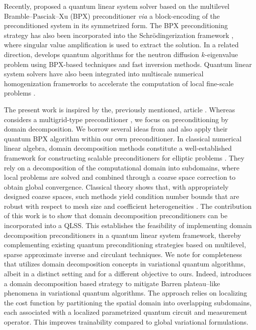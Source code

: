 \documentclass[onefignum,onetabnum]{siamart251216}
\begin{document}
Recently, \cite{Deiml_2025} proposed a quantum linear system solver based on the multilevel Bramble--Pasciak--Xu (BPX) preconditioner \cite{zbMATH04197323} \textit{via} a block-encoding of the preconditioned system in its symmetrized form. The BPX preconditioning strategy has also been incorporated into the Schrödingerization framework \cite{jin2025quantumpreconditioningmethodlinear}, where singular value amplification is used to extract the solution. In a related direction, \cite{childs2026quantumalgorithmsheterogeneouspdes} develops quantum algorithms for the neutron diffusion $k$-eigenvalue problem using BPX-based techniques and fast inversion methods. Quantum linear system solvers have also been integrated into multiscale numerical homogenization frameworks to accelerate the computation of local fine-scale problems \cite{balazi2026quantumenhancednumericalhomogenization}.

The present work is inspired by the, previously mentioned, article \cite{Deiml_2025}. Whereas \cite{Deiml_2025} considers a multigrid-type preconditioner \cite{zbMATH04197323,arXiv:2512.06166}, we focus on preconditioning by domain decomposition. We borrow several ideas from \cite{Deiml_2025} and also apply their quantum BPX algorithm within our own preconditioner. In classical numerical linear algebra, domain decomposition methods constitute a well-established framework for constructing scalable preconditioners for elliptic problems \cite{zbMATH02113718}. They rely on a decomposition of the computational domain into subdomains, where local problems are solved and combined through a coarse space correction to obtain global convergence. Classical theory shows that, with appropriately designed coarse spaces, such methods yield condition number bounds that are robust with respect to mesh size and coefficient heterogeneities \cite{zbMATH05029831,zbMATH05172548,zbMATH01592007,zbMATH05651315,spillane_geneo_2025,zbMATH06303461,zbMATH02113718}. The contribution of this work is to show that domain decomposition preconditioners can be incorporated into a QLSS.
This establishes the feasibility of implementing domain decomposition preconditioners in a quantum linear system framework, thereby complementing existing quantum preconditioning strategies based on multilevel, sparse approximate inverse and circulant techniques.
We note for completeness that \cite{busaleh2026mitigatingbarrenplateausdomain} utilizes domain decomposition concepts in variational quantum algorithms, albeit in a distinct setting and for a different objective to ours. Indeed, \cite{busaleh2026mitigatingbarrenplateausdomain} introduces a domain decomposition based strategy to mitigate Barren plateau–like phenomena in variational quantum algorithms. The approach relies on localizing the cost function by partitioning the spatial domain into overlapping subdomains, each associated with a localized parametrized quantum circuit and measurement operator. This improves trainability compared to global variational formulations.
\end{document}
